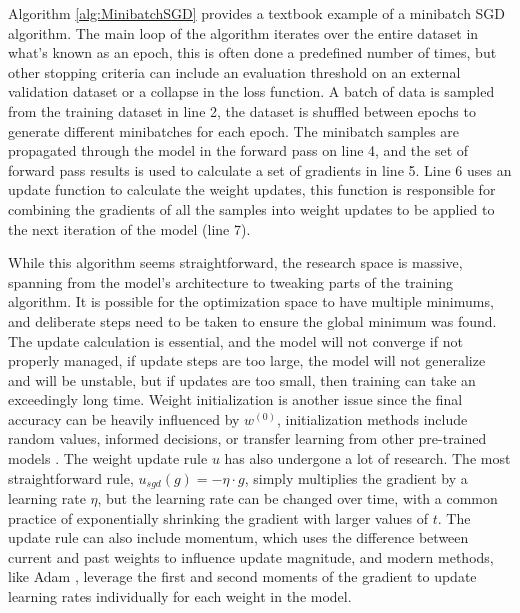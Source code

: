 Algorithm \ref{alg:MinibatchSGD} provides a textbook example of a minibatch SGD algorithm.
The main loop of the algorithm iterates over the entire dataset in what's known as an epoch, this is often done a predefined number of times, but other stopping criteria can include an evaluation threshold on an external validation dataset or a collapse in the loss function.
A batch of data is sampled from the training dataset in line 2, the dataset is shuffled between epochs to generate different minibatches for each epoch.
The minibatch samples are propagated through the model in the forward pass on line 4, and the set of forward pass results is used to calculate a set of gradients in line 5. 
Line 6 uses an update function to calculate the weight updates, this function is responsible for combining the gradients of all the samples into weight updates to be applied to the next iteration of the model (line 7).

While this algorithm seems straightforward, the research space is massive, spanning from the model's architecture to tweaking parts of the training algorithm.
It is possible for the optimization space to have multiple minimums, and deliberate steps need to be taken to ensure the global minimum was found. 
The update calculation is essential, and the model will not converge if not properly managed, if update steps are too large, the model will not generalize and will be unstable, but if updates are too small, then training can take an exceedingly long time.
Weight initialization is another issue since the final accuracy can be heavily influenced by $w^{(0)}$, initialization methods include random values, informed decisions, or transfer learning from other pre-trained models \cite{Glorot2010XavierInitalization}.
The weight update rule $u$ has also undergone a lot of research.
The most straightforward rule, $u_{sgd}(g)=-\eta \cdot g$, simply multiplies the gradient by a learning rate $\eta$, but the learning rate can be changed over time, with a common practice of exponentially shrinking the gradient with larger values of $t$.
The update rule can also include momentum, which uses the difference between current and past weights to influence update magnitude, and modern methods, like Adam \cite{Kingma2015Adam}, leverage the first and second moments of the gradient to update learning rates individually for each weight in the model.

